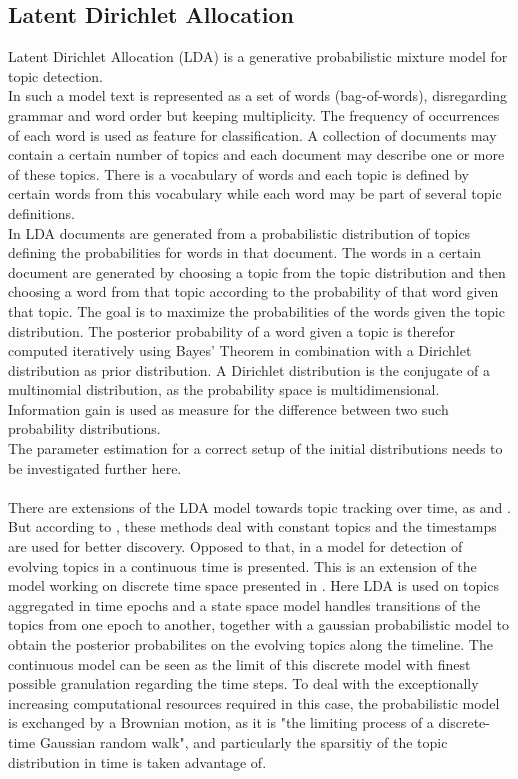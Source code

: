 \subsection{Latent Dirichlet Allocation}\label{sec:LDA}

Latent Dirichlet Allocation (LDA) \cite{Blei:2003:LDA:944919.944937}
 is a generative probabilistic mixture model for topic detection.
\\
In such a model text is represented as a set of words (bag-of-words), disregarding grammar and word order but keeping multiplicity. The frequency of occurrences of each word is used as feature for classification. A collection of documents may contain a certain number of topics and each document may describe one or more of these topics. There is a vocabulary of words and each topic is defined by certain words from this vocabulary while each word may be part of several topic definitions.
\\
In LDA documents are generated from a probabilistic distribution of topics defining the probabilities for words in that document. The words in a certain document are generated by choosing a topic from the topic distribution and then choosing a word from that topic according to the probability of that word given that topic. The goal is to maximize the probabilities of the words given the topic distribution.
The posterior probability of a word given a topic is therefor computed iteratively using Bayes' Theorem in combination with a Dirichlet distribution as prior distribution. A Dirichlet distribution is the conjugate of a multinomial distribution, as the probability space is multidimensional. Information gain is used as measure for the difference between two such probability distributions.
\\
The parameter estimation for a correct setup of the initial distributions needs to be investigated further here.
\\
\\
There are extensions of the LDA model towards topic tracking over time, as \cite{Wang:2006:TOT:1150402.1150450} and \cite{conf:ijcai:WeiSW07}. But according to \cite{conf:uai:WangBH08}, these methods deal with constant topics and the timestamps are used for better discovery. Opposed to that, in \cite{conf:uai:WangBH08} a model for detection of evolving topics in a continuous time is presented. This is an extension of the model working on discrete time space presented in \cite{Blei:2006:DTM:1143844.1143859}. Here LDA is used on topics aggregated in time epochs and a state space model handles transitions of the topics from one epoch to another, together with a gaussian probabilistic model to obtain the posterior probabilites on the evolving topics along the timeline. The continuous model can be seen as the limit of this discrete model with finest possible granulation regarding the time steps. To deal with the exceptionally increasing computational resources required in this case, the probabilistic model is exchanged by a Brownian motion, as it is "the limiting process of a discrete-time Gaussian random walk"\cite{Blei:2006:DTM:1143844.1143859}, and particularly the sparsitiy of the topic distribution in time is taken advantage of.


